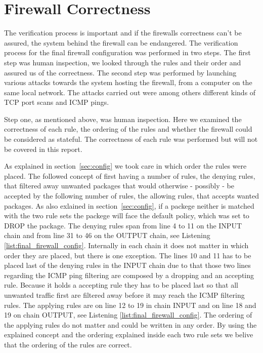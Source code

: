 \section{Firewall Correctness}
\label{sec:correctness}

The verification process is important and if the firewalls correctness can't be assured, the system behind the firewall can be endangered. The verification process for the final firewall configuration was performed in two steps. The first step was human inspection, we looked through the rules and their order and assured us of the correctness. The second step was performed by launching various attacks towards the system hosting the firewall, from a computer on the same local network. The attacks carried out were among others different kinds of TCP port scans and ICMP pings.

Step one, as mentioned above, was human inspection. Here we examined the correctness of each rule, the ordering of the rules and whether the firewall could be considered as stateful. The correctness of each rule was performed but will not be covered in this report.  

As explained in section~\ref{sec:config} we took care in which order the rules were placed. The followed concept of first having a number of rules, the denying rules, that filtered away unwanted packages that would otherwise - possibly - be accepted by the following number of rules, the allowing rules, that accepts wanted packages. As also exlained in section~\ref{sec:config}, if a packege neither is matched with the two rule sets the packege will face the default policy, which was set to DROP the package. The denying rules span from line 4 to 11 on the INPUT chain and from line 31 to 46 on the OUTPUT chain, see Listening \ref{list:final_firewall_config}. Internally in each chain it does not matter in which order they are placed, but there is one exception. The lines 10 and 11 has to be placed last of the denying rules in the INPUT chain due to that those two lines regarding the ICMP ping filtering are composed by a dropping and an accepting rule. Because it holds a accepting rule they has to be placed last so that all unwanted traffic first are filtered away before it may reach the ICMP filtering rules. The applying rules are on line 12 to 19 in chain INPUT and on line 18 and 19 on chain OUTPUT, see Listening \ref{list:final_firewall_config}. The ordering of the applying rules do not matter and could be written in any order. By using the explained concept and the ordering explained inside each two rule sets we belive that the ordering of the rules are correct.

